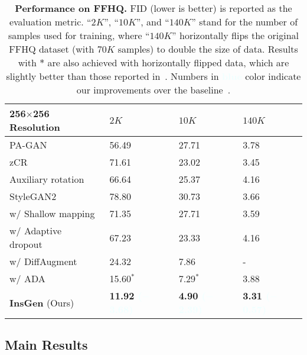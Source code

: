 \documentclass{article}
\begin{document}
\setlength{\tabcolsep}{15pt}
\begin{table}[t]
    \centering
    \caption{
        \textbf{Performance on FFHQ.}
FID (lower is better) is reported as the evaluation metric.
``$2K$'', ``$10K$'', and ``$140K$'' stand for the number of samples used for training, where ``$140K$'' horizontally flips the     original FFHQ dataset (with $70K$ samples) to double the size of data.
Results with $*$ are also achieved with horizontally flipped data, which are slightly better than those reported     in~\cite{karras2020training}.
Numbers in \textbf{\textcolor{azure}{blue}} color indicate our improvements over the baseline~\cite{karras2020training}.
    }
    \label{table:sota-ffhq}
    \vspace{0pt}
    \begin{tabular}{llll}
        \toprule
        256$\times$256 Resolution                     & $2K$    &  $10K$ & $140K$ \\
        \midrule
        PA-GAN~\cite{zhang2018pa}                     & 56.49  & 27.71  & 3.78 \\
        zCR~\cite{zhao2020improved}                   & 71.61  & 23.02  & 3.45 \\
        Auxiliary rotation~\cite{chen2019self}        & 66.64  & 25.37  & 4.16 \\
        \midrule
        StyleGAN2~\cite{karras2019style}              & 78.80  & 30.73  & 3.66 \\
        w/ Shallow mapping~\cite{karras2020training}  & 71.35  & 27.71  & 3.59 \\
        w/ Adaptive dropout~\cite{karras2020training} & 67.23  & 23.33  & 4.16 \\
        w/ DiffAugment~\cite{zhao2020differentiable}  & 24.32  & 7.86   & -    \\
        w/ ADA~\cite{karras2020training}              & 15.60$^*$  & 7.29$^*$   & 3.88 \\
        \midrule
        \textbf{InsGen} (Ours) & \textbf{11.92 \textcolor{azure}{($-$3.68)}}  & \textbf{4.90 \textcolor{azure}{($-$2.39)}}  & \textbf{3.31 \textcolor{azure}{($-$0.57)}} \\
        \bottomrule
    \end{tabular}
    \vspace{-10pt}
\end{table}


\subsection{Main Results}\label{subsec:sota}
\end{document}
